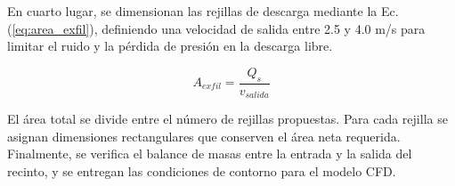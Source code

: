 En cuarto lugar, se dimensionan las rejillas de descarga mediante la Ec. (\ref{eq:area_exfil}), definiendo una velocidad de salida entre 2.5 y 4.0 m/s para limitar el ruido y la pérdida de presión en la descarga libre.

\begin{equation}
	A_{exfil} = \frac{Q_s}{v_{salida}}
	\label{eq:area_exfil}
\end{equation}

El área total se divide entre el número de rejillas propuestas. Para cada rejilla se asignan dimensiones rectangulares que conserven el área neta requerida. Finalmente, se verifica el balance de masas entre la entrada y la salida del recinto, y se entregan las condiciones de contorno para el modelo CFD.
